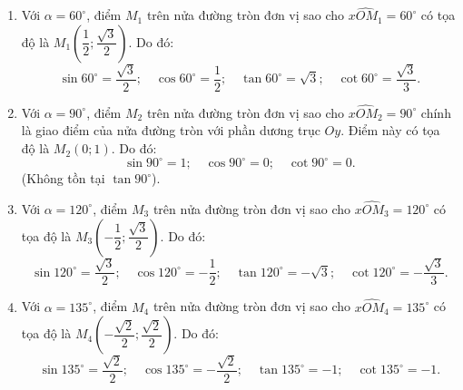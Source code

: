 \begin{vd}
{\begin{center}
		\end{center}
		
		\begin{enumerate}
			\item[a)] Với $\alpha = 60^\circ$, điểm $M_1$ trên nửa đường tròn đơn vị sao cho $\widehat{xOM_1} = 60^\circ$ có tọa độ là $M_1\left(\dfrac{1}{2}; \dfrac{\sqrt{3}}{2}\right)$. Do đó:
			$$ \sin 60^\circ = \dfrac{\sqrt{3}}{2}; \quad \cos 60^\circ = \dfrac{1}{2}; \quad \tan 60^\circ = \sqrt{3}; \quad \cot 60^\circ = \dfrac{\sqrt{3}}{3}. $$
			
			\item[b)] Với $\alpha = 90^\circ$, điểm $M_2$ trên nửa đường tròn đơn vị sao cho $\widehat{xOM_2} = 90^\circ$ chính là giao điểm của nửa đường tròn với phần dương trục $Oy$. Điểm này có tọa độ là $M_2(0; 1)$. Do đó:
			$$ \sin 90^\circ = 1; \quad \cos 90^\circ = 0; \quad \cot 90^\circ = 0. $$
			(Không tồn tại $\tan 90^\circ$).
			
			\item[c)] Với $\alpha = 120^\circ$, điểm $M_3$ trên nửa đường tròn đơn vị sao cho $\widehat{xOM_3} = 120^\circ$ có tọa độ là $M_3\left(-\dfrac{1}{2}; \dfrac{\sqrt{3}}{2}\right)$. Do đó:
			$$ \sin 120^\circ = \dfrac{\sqrt{3}}{2}; \quad \cos 120^\circ = -\dfrac{1}{2}; \quad \tan 120^\circ = -\sqrt{3}; \quad \cot 120^\circ = -\dfrac{\sqrt{3}}{3}. $$
			
			\item[d)] Với $\alpha = 135^\circ$, điểm $M_4$ trên nửa đường tròn đơn vị sao cho $\widehat{xOM_4} = 135^\circ$ có tọa độ là $M_4\left(-\dfrac{\sqrt{2}}{2}; \dfrac{\sqrt{2}}{2}\right)$. Do đó:
			$$ \sin 135^\circ = \dfrac{\sqrt{2}}{2}; \quad \cos 135^\circ = -\dfrac{\sqrt{2}}{2}; \quad \tan 135^\circ = -1; \quad \cot 135^\circ = -1. $$
		\end{enumerate}
	}
\end{vd} 
